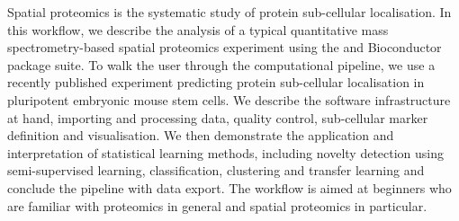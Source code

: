 Spatial proteomics is the systematic study of protein sub-cellular
localisation. In this workflow, we describe the analysis of a typical
quantitative mass spectrometry-based spatial proteomics experiment
using the  and  Bioconductor package
suite. To walk the user through the computational pipeline, we use a
recently published experiment predicting protein sub-cellular
localisation in pluripotent embryonic mouse stem cells. We describe
the software infrastructure at hand, importing and processing data,
quality control, sub-cellular marker definition and visualisation. We
then demonstrate the application and interpretation of statistical
learning methods, including novelty detection using semi-supervised
learning, classification, clustering and transfer learning and
conclude the pipeline with data export. The workflow is aimed at
beginners who are familiar with proteomics in general and spatial
proteomics in particular.

